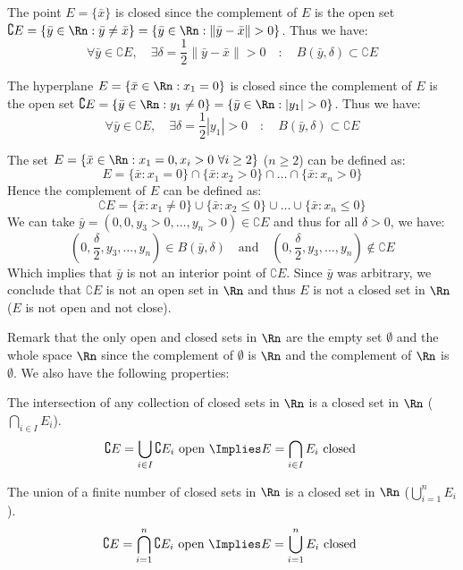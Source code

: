 \begin{eg}
    The point $E = \{\bar{x}\}$ is closed since the complement of $E$ is the open set $\complement E = \{\bar{y} \in \Rn : \bar{y} \neq \bar{x}\} = \{\bar{y} \in \Rn : \|\bar{y} - \bar{x} \| > 0\}$. Thus we have:
    \[
        \forall \bar{y} \in \complement E, \quad \exists \delta = \frac{1}{2} \|\bar{y} - \bar{x}\| > 0 \quad : \quad B(\bar{y}, \delta) \subset \complement E
    \]
\end{eg}

\begin{eg}
    The hyperplane $E = \{\bar{x} \in \Rn : x_1 = 0\}$ is closed since the complement of $E$ is the open set $\complement E = \{\bar{y} \in \Rn : y_1 \neq 0\} = \{\bar{y} \in \Rn : |y_1| > 0\}$. Thus we have:
    \[
        \forall \bar{y} \in \complement E, \quad \exists \delta = \frac{1}{2} |y_1| > 0 \quad : \quad B(\bar{y}, \delta) \subset \complement E
    \]
\end{eg}

\begin{eg}
    The set $E = \{\bar{x} \in \Rn : x_1 = 0, x_i > 0 \ \forall i \geq 2\}$ ($n \geq 2$) can be defined as:
    \[
        E = \{\bar{x} : x_1 = 0\} \cap \{\bar{x} : x_2 > 0\} \cap \ldots \cap \{\bar{x} : x_n > 0\}
    \]
    Hence the complement of $E$ can be defined as:
    \[
        \complement E = \{\bar{x} : x_1 \neq 0\} \cup \{\bar{x} : x_2 \leq 0\} \cup \ldots \cup \{\bar{x} : x_n \leq 0\}
    \]
    We can take $\bar{y} = (0,0,y_3 > 0, \ldots, y_n > 0) \in \complement E$ and thus for all $\delta > 0$, we have:
    \[
        (0, \frac{\delta}{2}, y_3, \ldots, y_n) \in B(\bar{y}, \delta) \quad \text{and} \quad (0, \frac{\delta}{2}, y_3, \ldots, y_n) \notin \complement E
    \]
    Which implies that $\bar{y}$ is not an interior point of $\complement E$. Since $\bar{y}$ was arbitrary, we conclude that $\complement E$ is not an open set in $\Rn$ and thus $E$ is not a closed set in $\Rn$ ($E$ is not open and not close).
\end{eg}
Remark that the only open and closed sets in $\Rn$ are the empty set $\emptyset$ and the whole space $\Rn$ since the complement of $\emptyset$ is $\Rn$ and the complement of $\Rn$ is $\emptyset$. We also have the following properties:
\begin{citemize}
    \item The intersection of any collection of closed sets in $\Rn$ is a closed set in $\Rn$ ($\bigcap_{i \in I} E_i$).
    \[
        \complement E = \bigcup_{i \in I} \complement E_i \text{ open } \Implies E = \bigcap_{i \in I} E_i \text{ closed }
    \]
    \item The union of a finite number of closed sets in $\Rn$ is a closed set in $\Rn$ ($\bigcup_{i = 1}^n E_i$).
    \[
        \complement E = \bigcap_{i = 1}^n \complement E_i \text{ open } \Implies E = \bigcup_{i = 1}^n E_i \text{ closed }
    \]
\end{citemize}


